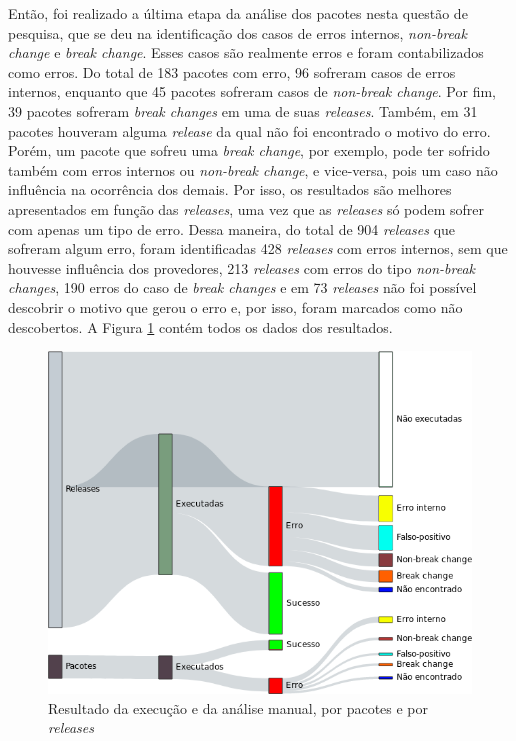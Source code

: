Então, foi realizado a última etapa da análise dos pacotes nesta questão de pesquisa, que se deu na identificação dos casos de erros internos, \textit{non-break change} e \textit{break change}. Esses casos são realmente erros e foram contabilizados como erros. Do total de 183 pacotes com erro, 96 sofreram casos de erros internos, enquanto que 45 pacotes sofreram casos de \textit{non-break change}. Por fim, 39 pacotes sofreram \textit{break changes} em uma de suas \textit{releases}. Também, em 31 pacotes houveram alguma \textit{release} da qual não foi encontrado o motivo do erro. Porém, um pacote que sofreu uma \textit{break change}, por exemplo, pode ter sofrido também com erros internos ou \textit{non-break change}, e vice-versa, pois um caso não influência na ocorrência dos demais. Por isso, os resultados são melhores apresentados em função das \textit{releases}, uma vez que as \textit{releases} só podem sofrer com apenas um tipo de erro. Dessa maneira, do total de 904 \textit{releases} que sofreram algum erro, foram identificadas 428 \textit{releases} com erros internos, sem que houvesse influência dos provedores, 213 \textit{releases} com erros do tipo \textit{non-break changes}, 190 erros do caso de \textit{break changes} e em 73 \textit{releases} não foi possível descobrir o motivo que gerou o erro e, por isso, foram marcados como não descobertos. A Figura \ref{fig:res_rq1_g} contém todos os dados dos resultados.

\begin{figure}
    \centering
    \includegraphics[scale=0.6]{figuras/result_rq1_g.png}
    \caption{Resultado da execução e da análise manual, por pacotes e por \textit{releases}}
    \label{fig:res_rq1_g}
\end{figure}{}

